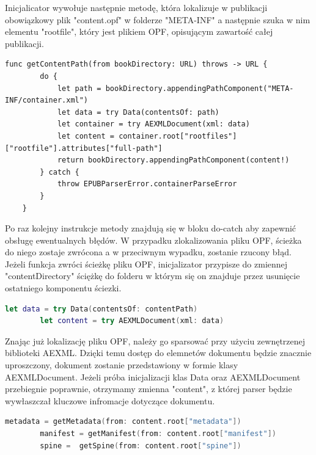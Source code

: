 Inicjalicator wywołuje następnie metodę, która lokalizuje w publikacji obowiązkowy plik "content.opf" w folderze "META-INF" a następnie szuka w nim elementu "rootfile", który jest plikiem OPF, opisującym zawartość całej publikacji.

\begin{lstlisting}[caption={Implementacja metody getContentPath(from bookDirectory:).},language=swift-reference]
    func getContentPath(from bookDirectory: URL) throws -> URL {
        do {
            let path = bookDirectory.appendingPathComponent("META-INF/container.xml")
            let data = try Data(contentsOf: path)
            let container = try AEXMLDocument(xml: data)
            let content = container.root["rootfiles"]["rootfile"].attributes["full-path"]
            return bookDirectory.appendingPathComponent(content!)
        } catch {
            throw EPUBParserError.containerParseError
        }
    }
\end{lstlisting}

Po raz kolejny instrukcje metody znajdują się w bloku do-catch aby zapewnić obsługę ewentualnych błędów. W przypadku zlokalizowania pliku OPF, ścieżka do niego zostaje zwrócona a w przeciwnym wypadku, zostanie rzucony błąd. Jeżeli funkcja zwróci ścieżkę pliku OPF, inicjalizator przypisze do zmiennej "contentDirectory" ściężkę do folderu w którym się on znajduje przez usunięcie ostatniego komponentu ściezki.

\begin{lstlisting}[firstnumber=14, language=swift]
        let data = try Data(contentsOf: contentPath)
        let content = try AEXMLDocument(xml: data)
\end{lstlisting}

Znając już lokalizację pliku OPF, należy go sparsować przy użyciu zewnętrzenej biblioteki AEXML. Dzięki temu dostęp do elemnetów dokumentu będzie znacznie uproszczony, dokument zostanie przedstawiony w formie klasy AEXMLDocument. Jeżeli próba inicjalizacji klas Data oraz AEXMLDocument przebiegnie poprawnie, otrzymamy zmienna "content", z której parser będzie wywłaszczał kluczowe infromacje dotyczące dokumentu.

\begin{lstlisting}[firstnumber=16, language=swift]
        metadata = getMetadata(from: content.root["metadata"])
        manifest = getManifest(from: content.root["manifest"])
        spine =  getSpine(from: content.root["spine"])
\end{lstlisting}

